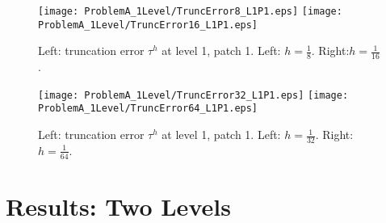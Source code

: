 \documentclass[12pt]{article}
\begin{document}
\begin{figure}[htbp]
\begin{center}
\texttt{[image: ProblemA\_1Level/TruncError8\_L1P1.eps]}
\texttt{[image: ProblemA\_1Level/TruncError16\_L1P1.eps]}
\end{center}
\caption{Left: truncation error $\tau^h$ at level 1, patch 1. Left:
$h = \frac{1}{8}$. Right:$h = \frac{1}{16}$.}
\label{Trunc_8_16}
\end{figure}  

\begin{figure}[htbp]
\begin{center}
\texttt{[image: ProblemA\_1Level/TruncError32\_L1P1.eps]}
\texttt{[image: ProblemA\_1Level/TruncError64\_L1P1.eps]}
\end{center}
\caption{Left: truncation error $\tau^h$ at level 1, patch 1. Left:
$h = \frac{1}{32}$. Right:$h = \frac{1}{64}$.}
\label{Trunc_32_64}
\end{figure}  



\newpage
\section{Results: Two Levels}
\label{Results2}


\end{document}
